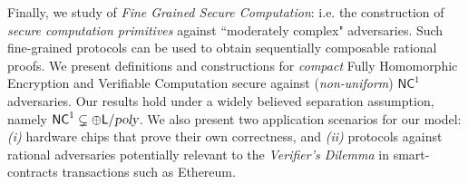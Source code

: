 	
  Finally, we study of {\em Fine Grained Secure Computation}: i.e. 
  the construction of {\em secure computation primitives} against ``moderately complex" adversaries. Such fine-grained protocols can be used to obtain sequentially composable rational proofs. We present definitions and constructions for \textit{compact} Fully Homomorphic Encryption and Verifiable Computation secure against (\textit{non-uniform}) $\mathsf{NC}^1$ adversaries. Our results hold under a widely believed separation assumption, namely ${\mathsf{NC}}^1 \subsetneq \oplus {\ensuremath{\mathsf{L}}} / {\textsl{poly}}$. We also present two application scenarios for our model: \textit{(i)} hardware chips that prove their own correctness, and \textit{(ii)} protocols against rational adversaries potentially relevant to the {\em Verifier's Dilemma} in smart-contracts transactions such as Ethereum. 
